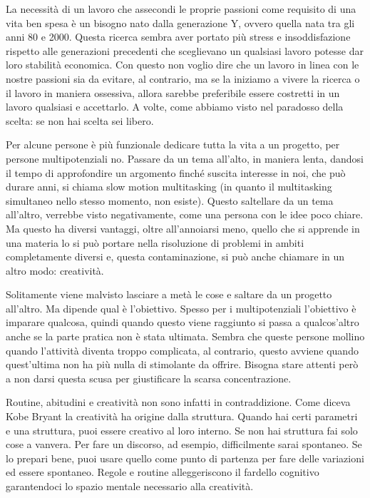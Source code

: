 \documentclass[12pt]{book} %
\begin{document}
\begin{mdframed}[linewidth=1pt]
La necessità di un lavoro che assecondi le proprie passioni come requisito di una vita ben spesa è un bisogno nato dalla
generazione Y, ovvero quella nata tra gli anni 80 e 2000. Questa ricerca sembra aver portato più stress e
insoddisfazione rispetto alle generazioni precedenti che sceglievano un qualsiasi lavoro potesse dar loro stabilità
economica. Con questo non voglio dire che un lavoro in linea con le nostre passioni sia da evitare, al contrario, ma se
la iniziamo a vivere la ricerca o il lavoro in maniera ossessiva, allora sarebbe preferibile essere costretti in un
lavoro qualsiasi e accettarlo. A volte, come abbiamo visto nel paradosso della scelta: se non hai scelta sei libero.

Per alcune persone è più funzionale dedicare tutta la vita a un progetto, per persone multipotenziali no. Passare da un tema
all'alto, in maniera lenta, dandosi il tempo di approfondire un argomento finché suscita interesse
in noi, che può durare anni, si chiama slow motion multitasking (in quanto il multitasking simultaneo nello stesso
momento, non esiste). Questo saltellare da un tema all'altro, verrebbe visto negativamente, come
una persona con le idee poco chiare. Ma questo ha diversi vantaggi, oltre all'annoiarsi meno,
quello che si apprende in una materia lo si può portare nella risoluzione di problemi in ambiti completamente diversi
e, questa contaminazione, si può anche chiamare in un altro modo:
creatività.

Solitamente viene malvisto lasciare a metà le cose e saltare da un progetto all'altro. Ma dipende
qual è l'obiettivo. Spesso per i multipotenziali l'obiettivo è imparare
qualcosa, quindi quando questo viene raggiunto si passa a qualcos'altro anche se la parte pratica
non è stata ultimata. Sembra che queste persone mollino quando l'attività diventa troppo
complicata, al contrario, questo avviene quando quest'ultima non ha più nulla di stimolante da
offrire. Bisogna stare attenti però a non darsi questa scusa per giustificare la scarsa concentrazione.

Routine, abitudini e creatività non sono infatti in contraddizione. Come diceva Kobe Bryant la creatività ha origine
dalla struttura. Quando hai certi parametri e una struttura, puoi essere creativo al loro interno. Se non hai struttura
fai solo cose a vanvera. Per fare un discorso, ad esempio, difficilmente sarai spontaneo. Se lo prepari bene, puoi usare quello come punto di partenza per fare delle variazioni ed essere spontaneo. Regole e routine alleggeriscono il fardello cognitivo garantendoci lo spazio mentale
necessario alla creatività.


\end{mdframed}
\end{document}
